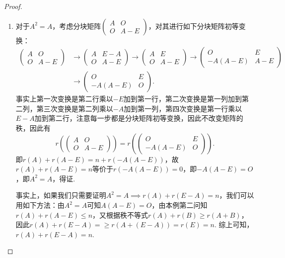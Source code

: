 \begin{proof}
\begin{enumerate}
        \item 对于$A^2=A$，考虑分块矩阵$\begin{pmatrix}
                      A & O \\ O & A-E
                  \end{pmatrix}$，对其进行如下分块矩阵初等变换：
              \begin{align*}
                  \begin{pmatrix}
                      A & O \\ O & A-E
                  \end{pmatrix} & \to\begin{pmatrix}
                                         A & E-A \\ O & A-E
                                     \end{pmatrix}
                  \to\begin{pmatrix}
                         A & E \\ O & A-E
                     \end{pmatrix}
                  \to\begin{pmatrix}
                         O & E \\ -A(A-E) & A-E
                     \end{pmatrix}                   \\
                                    & \to\begin{pmatrix}
                                             O & E \\ -A(A-E) & O
                                         \end{pmatrix}.
              \end{align*}
              事实上第一次变换是第二行乘以$-E$加到第一行，第二次变换是第一列加到第二列，第三次变换是第二列乘以$-A$加到第一列，第四次变换是第一行乘以$E-A$加到第二行，注意每一步都是分块矩阵初等变换，因此不改变矩阵的秩，因此有
              \[r(\begin{pmatrix}
                      A & O \\ O & A-E
                  \end{pmatrix})=r(\begin{pmatrix}
                      O & E \\ -A(A-E) & O
                  \end{pmatrix}).\]
              即$r(A)+r(A-E)=n+r(-A(A-E))$，故$r(A)+r(A-E)=n$等价于$r(-A(A-E))=0$，即$-A(A-E)=O$，即$A^2=A$，得证.

              事实上，如果我们只需要证明$A^2=A \implies r(A)+r(E-A)=n$，我们可以用如下方法：由$A^2=A$可知$A(A-E)=O$，由本例第二问知$r(A)+r(A-E)\leqslant n$，又根据秩不等式$r(A)+r(B)\geqslant r(A+B)$，因此$r(A)+r(E-A)=\geqslant r(A+(E-A))=r(E)=n$. 综上可知，$r(A)+r(E-A)=n$.
    \end{enumerate}
\end{proof}

